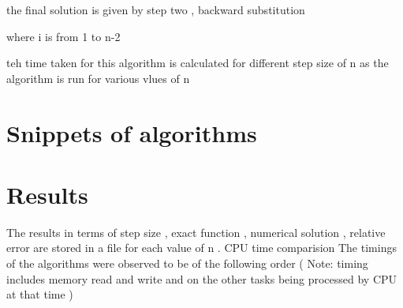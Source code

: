 \documentclass{article}
\begin{document}
the final solution is given by step two ,
backward substitution 






where i is from 1 to n-2

teh time taken for  this algorithm is calculated for different step size of n as the algorithm is run for various vlues of n 


\section{Snippets of algorithms}


\section{Results}
The results in terms of step size , exact function , numerical solution , relative error are stored in a file for each value of n .
CPU time comparision 
The timings of the algorithms were observed to be of the following order
( Note: timing  includes memory read and write and on the other tasks being processed by CPU at that time  )
\end{document}
